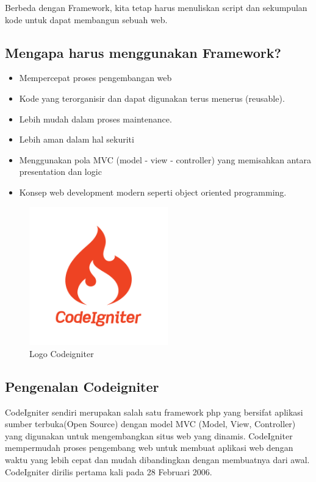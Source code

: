 \begin{enumerate}
Berbeda dengan Framework, kita tetap harus menuliskan script dan sekumpulan kode untuk dapat membangun sebuah web. 

\subsection{Mengapa harus menggunakan Framework?}
\begin{itemize}
	\item Mempercepat proses pengembangan web
	\item Kode yang terorganisir dan dapat digunakan terus menerus (reusable).
	\item Lebih mudah dalam proses maintenance.
	\item Lebih aman dalam hal sekuriti
	\item Menggunakan pola MVC (model - view - controller) yang memisahkan antara presentation dan logic
	\item Konsep web development modern seperti object oriented programming.

\end{itemize}

	\begin{figure}[H]
		\includegraphics[width=6cm]{figures/web/logocodeigniter.png}
		\centering
		\caption{Logo Codeigniter}
	\end{figure}

\subsection{Pengenalan Codeigniter}

CodeIgniter sendiri merupakan salah satu framework php yang bersifat aplikasi sumber terbuka(Open Source) dengan model MVC (Model, View, Controller) yang digunakan untuk mengembangkan situs web yang dinamis. CodeIgniter mempermudah proses pengembang web untuk membuat aplikasi web dengan waktu yang lebih cepat dan mudah dibandingkan dengan membuatnya dari awal. CodeIgniter dirilis pertama kali pada 28 Februari 2006. 


\end{enumerate}
